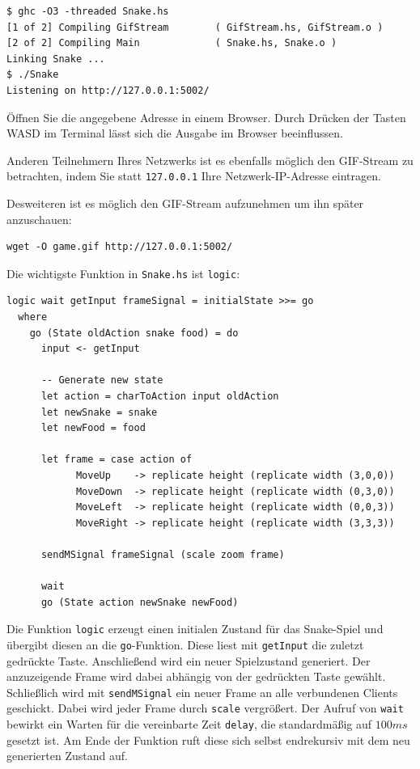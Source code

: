 \documentclass{scrartcl}
\begin{document}
\begin{lstlisting}
$ ghc -O3 -threaded Snake.hs
[1 of 2] Compiling GifStream        ( GifStream.hs, GifStream.o )
[2 of 2] Compiling Main             ( Snake.hs, Snake.o )
Linking Snake ...
$ ./Snake
Listening on http://127.0.0.1:5002/
\end{lstlisting}

Öffnen Sie die angegebene Adresse in einem Browser.
Durch Drücken der Tasten WASD im Terminal lässt sich die Ausgabe im Browser beeinflussen.

Anderen Teilnehmern Ihres Netzwerks ist es ebenfalls möglich den GIF-Stream zu betrachten, indem Sie statt \texttt{127.0.0.1} Ihre Netzwerk-IP-Adresse eintragen.

Desweiteren ist es möglich den GIF-Stream aufzunehmen um ihn später anzuschauen:

\begin{lstlisting}
wget -O game.gif http://127.0.0.1:5002/
\end{lstlisting}

Die wichtigste Funktion in \texttt{Snake.hs} ist \texttt{logic}:

\begin{lstlisting}
logic wait getInput frameSignal = initialState >>= go
  where
    go (State oldAction snake food) = do
      input <- getInput

      -- Generate new state
      let action = charToAction input oldAction
      let newSnake = snake
      let newFood = food

      let frame = case action of
            MoveUp    -> replicate height (replicate width (3,0,0))
            MoveDown  -> replicate height (replicate width (0,3,0))
            MoveLeft  -> replicate height (replicate width (0,0,3))
            MoveRight -> replicate height (replicate width (3,3,3))

      sendMSignal frameSignal (scale zoom frame)

      wait
      go (State action newSnake newFood)
\end{lstlisting}

Die Funktion \texttt{logic} erzeugt einen initialen Zustand für das Snake-Spiel und übergibt diesen an die \texttt{go}-Funktion.
Diese liest mit \texttt{getInput} die zuletzt gedrückte Taste.
Anschließend wird ein neuer Spielzustand generiert.
Der anzuzeigende Frame wird dabei abhängig von der gedrückten Taste gewählt.
Schließlich wird mit \texttt{sendMSignal} ein neuer Frame an alle verbundenen Clients geschickt.
Dabei wird jeder Frame durch \texttt{scale} vergrößert.
Der Aufruf von \texttt{wait} bewirkt ein Warten für die vereinbarte Zeit \texttt{delay}, die standardmäßig auf $100 ms$ gesetzt ist.
Am Ende der Funktion ruft diese sich selbst endrekursiv mit dem neu generierten Zustand auf.
\end{document}
